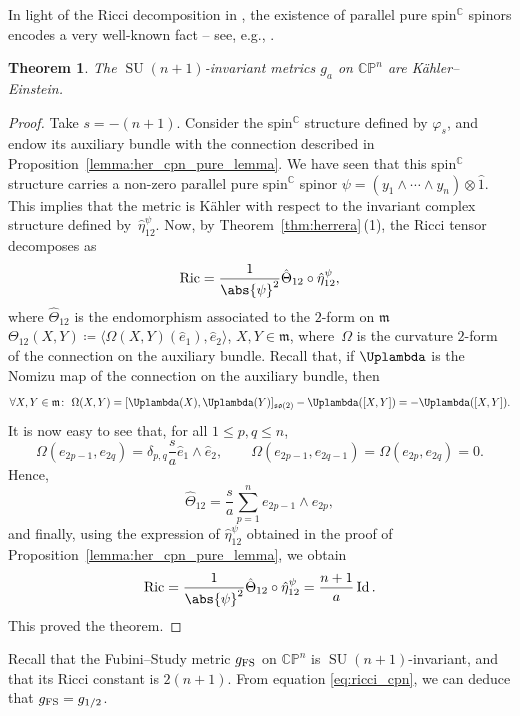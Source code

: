 \documentclass[pdftex]{sigma}
\numberwithin{equation}{section}
\newtheorem{Theorem}{Theorem}[section]
\newcommand{\C}{\mathbb{C}} %
\DeclareMathOperator{\Id}{Id}
\DeclareMathOperator{\SU}{SU}
\DeclareMathOperator{\Ric}{Ric}
\begin{document}
		In light of the Ricci decomposition in \cite[Theorem~3.1]{EH16}, the existence of parallel pure spin$^{\C}$ spinors encodes a very well-known fact -- see, e.g., \cite{ziller}.
		
		\begin{Theorem}\label{cor:cpn_conclusion}
			The $\SU(n+1)$-invariant metrics $g_a$ on $\mathbb{CP}^n$ are K\"{a}hler--Einstein.
		\end{Theorem}
		\begin{proof}
			Take $s=-(n+1)$. Consider the spin$^{\C}$ structure defined by $\varphi_s$, and endow its auxiliary bundle with the connection described in Proposition~\ref{lemma:her_cpn_pure_lemma}. We have seen that this spin$^{\C}$ structure carries a non-zero parallel pure spin$^{\C}$ spinor $\psi = (y_1 \wedge \cdots \wedge y_n) \otimes \hat{1} $. This implies that the metric is K\"{a}hler \cite[Corollary~4.10]{ES19} with respect to the invariant complex structure defined by~$\hat{\eta}^{\psi}_{12}$. Now, by Theorem~\ref{thm:herrera}\,(1), the Ricci tensor decomposes as
\[
			\Ric = \frac{1}{\abs{\psi}^2} \hat{\Theta}_{1 2} \circ \hat{\eta}_{1 2}^{\psi} ,
\]
			where $\hat{\Theta}_{1 2}$ is the endomorphism associated to the $2$-form on $\mathfrak{m}$
			$
			\Theta_{1 2} (X,Y) \coloneqq \langle \Omega(X,Y) ( \hat{e}_1 ) , \hat{e}_2 \rangle $, $ X,Y \in \mathfrak{m}$,
			where~$\Omega$ is the curvature $2$-form of the connection on the auxiliary bundle. Recall \cite{ANT} that, if $\Uplambda$ is the Nomizu map of the connection on the auxiliary bundle, then
			\[
			\forall X,Y \in \mathfrak{m} \colon\ \Omega(X,Y) = [ \Uplambda(X), \Uplambda(Y) ]_{\mathfrak{so}(2)} - \Uplambda( [X,Y] ) = - \Uplambda( [X,Y] ) .
			\]
			It is now easy to see that, for all $1 \leq p, q \leq n$,
			\[
			\Omega( e_{2p-1}, e_{2q} ) = \delta_{p,q} \frac{s}{a} \hat{e}_1 \wedge \hat{e}_2 , \qquad \Omega( e_{2p-1}, e_{2q-1} ) = \Omega( e_{2p}, e_{2q} ) = 0 .
			\]
			Hence,
			\[
			\hat{\Theta}_{1 2} = \frac{s}{a} \sum_{p=1}^n e_{2p-1} \wedge e_{2p} ,
			\]
			and finally, using the expression of $\hat{\eta}^{\psi}_{12}$ obtained in the proof of Proposition~\ref{lemma:her_cpn_pure_lemma}, we obtain
			\begin{equation}\label{eq:ricci_cpn}
				\Ric = \frac{1}{\abs{\psi}^2} \hat{\Theta}_{1 2} \circ \hat{\eta}_{1 2}^{\psi} = \frac{n+1}{a} \Id .
			\end{equation}
This proved the theorem.
		\end{proof}

		\begin{Remark}
			Recall that the Fubini--Study metric $g_{\rm FS}$ on $\mathbb{CP}^n$ is $\SU(n+1)$-invariant, and that its Ricci constant is $2(n+1)$. From equation \eqref{eq:ricci_cpn}, we can deduce that $g_{\rm FS}=g_{1/2}$.
		\end{Remark}
		
\end{document}
